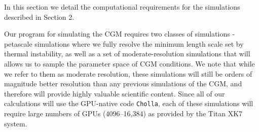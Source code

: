 \documentclass[11pt,letterpaper,english]{article}
\begin{document}




In this section we detail the computational requirements for the simulations described in Section 2.

Our program for simulating the CGM requires two classes of simulations - petascale simulations where we fully resolve the minimum length scale set by thermal instability, as well as a set of moderate-resolution simulations that will allows us to sample the parameter space of CGM conditions. We note that while we refer to them as moderate resolution, these simulations will still be orders of magnitude better resolution than any previous simulations of the CGM, and therefore will provide highly valuable scientific content. Since all of our calculations will use the GPU-native code {\tt Cholla}, each of these simulations will require large numbers of GPUs (4096--16,384) as provided by the Titan XK7 system.
\end{document}
